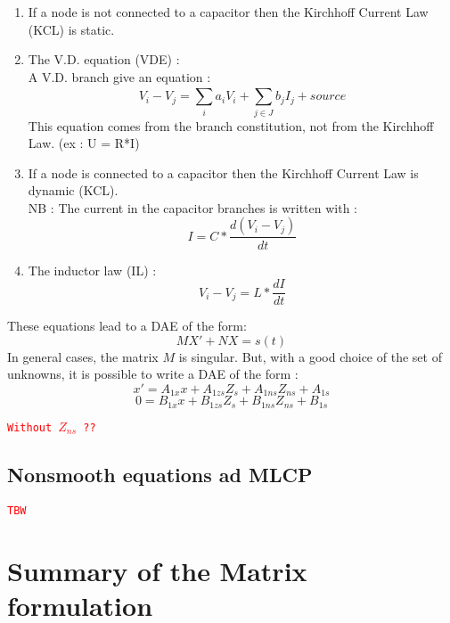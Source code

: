 \begin{enumerate} 
 \item If a node is not connected to a capacitor then the Kirchhoff Current Law (KCL) is static. \\
  \item The V.D. equation (VDE) : \\
    A V.D. branch give an equation :
    \[V_{i}-V_{j} = \sum_{i}^{}a_{i}V_{i} + \sum_{j\in J}^{}b_{j}I_{j} +   source\]
    This equation comes from the branch constitution, not from the Kirchhoff Law. (ex : U = R*I)
  \item If a node is connected to a capacitor then the Kirchhoff Current Law is dynamic (KCL).\\
    NB : The current in the capacitor branches is written with :
    \[I = C*\frac{d(V_{i} - V_{j})}{dt}\]
  \item The inductor law (IL) : 
     \[V_{i} - V_{j} = L*\frac{dI}{dt}\]
\end{enumerate}

These equations lead to a DAE of the form:
\[MX'+NX=s(t)\]
In general cases, the matrix $M$ is singular. But, with a good choice of the set of unknowns, it is possible to write a DAE of the form :
\[x' = A_{1x}x +A_{1zs}Z_{s} + A_{1ns}Z_{ns}+A_{1s}\]
\[0  = B_{1x}x+B_{1zs}Z_{s} + B_{1ns}Z_{ns}+B_{1s}\]

\textcolor{red}{\tt Without $Z_{ns}$ ??}
\subsection{Nonsmooth equations ad MLCP}
\textcolor{red}{\tt TBW}

\newpage
\section{Summary of  the Matrix formulation}

